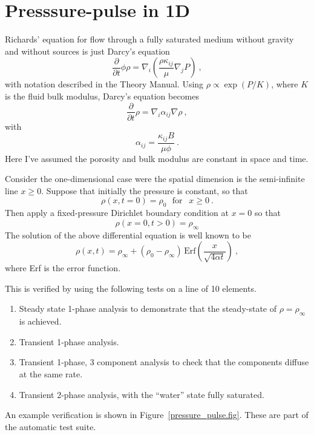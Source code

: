 \chapter{Presssure-pulse in 1D}

Richards' equation for flow through a fully saturated medium without
gravity and without sources is just Darcy's equation
\begin{equation}
\frac{\partial}{\partial t}\phi\rho = \nabla_{i}\left(\frac{\rho
  \kappa_{ij}}{\mu} \nabla_{j}P \right) \ ,
\end{equation}
with notation described in the Theory Manual.  Using $\rho \propto
\exp(P/K)$, where $K$ is the fluid bulk modulus, Darcy's equation
becomes
\begin{equation}
\frac{\partial}{\partial t}\rho = \nabla_{i}\alpha_{ij}\nabla\rho \ ,
\end{equation}
with
\begin{equation}
\alpha_{ij} = \frac{\kappa_{ij}B}{\mu\phi} \ .
\end{equation}
Here I've assumed the porosity and bulk modulus are constant in space
and time.

Consider the one-dimensional case were the spatial dimension is the
semi-infinite line $x\geq 0$.  Suppose that initially the pressure is
constant, so that
\begin{equation}
\rho(x, t=0) = \rho_{0} \ \ \ \mbox{for }\ \ x\geq 0 \ .
\end{equation}
Then apply a fixed-pressure Dirichlet boundary condition at $x=0$ so
that
\begin{equation}
\rho(x=0, t>0) = \rho_{\infty}
\end{equation}
The solution of the above differential equation is well known to be
\begin{equation}
\rho(x, t) = \rho_{\infty} + (\rho_{0} -
\rho_{\infty})\,\mbox{Erf}\left( \frac{x}{\sqrt{4\alpha t}} \right) \ ,
\label{eqn.exact.pp}
\end{equation}
where Erf is the error function.

This is verified by using the following tests on a line of
10 elements.
\begin{enumerate}
\item Steady state 1-phase analysis to demonstrate that the
  steady-state of $\rho = \rho_{\infty}$ is achieved.
\item Transient 1-phase analysis.
\item Transient 1-phase, 3 component analysis to check that the components diffuse at the same rate.
\item Transient 2-phase analysis, with the ``water'' state fully saturated.
\end{enumerate}
An example verification is shown in Figure~\ref{pressure_pulse.fig}.
These are part of the automatic test suite.

